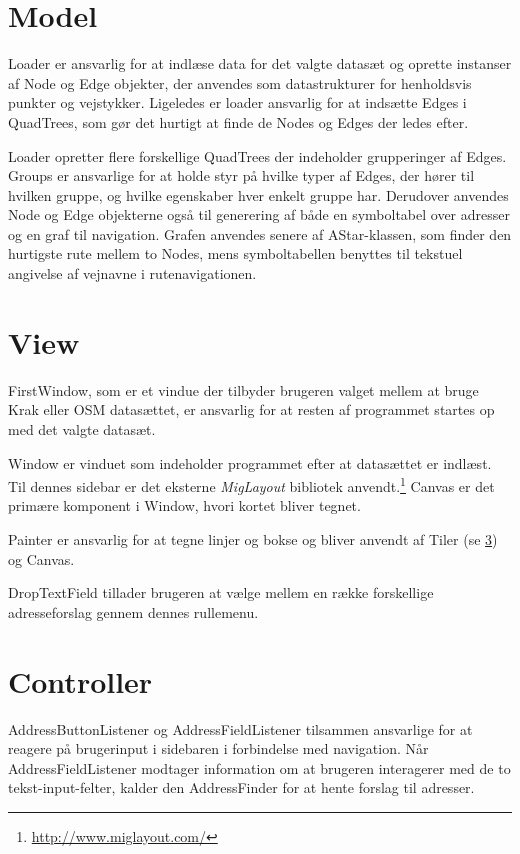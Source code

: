 \section{Model}
\label{sec:model}

Loader er ansvarlig for at indlæse data for det valgte datasæt og oprette instanser af Node og Edge objekter, der anvendes som datastrukturer for henholdsvis punkter og vejstykker. Ligeledes er loader ansvarlig for at indsætte Edges i QuadTrees, som gør det hurtigt at finde de Nodes og Edges der ledes efter.

Loader opretter flere forskellige QuadTrees der indeholder grupperinger af Edges. Groups er ansvarlige for at holde styr på hvilke typer af Edges, der hører til hvilken gruppe, og hvilke egenskaber hver enkelt gruppe har. Derudover anvendes Node og Edge objekterne også til generering af både en symboltabel over adresser og en graf til navigation. Grafen anvendes senere af AStar-klassen, som finder den hurtigste rute mellem to Nodes, mens symboltabellen benyttes til tekstuel angivelse af vejnavne i rutenavigationen.
	
\section{View}
\label{sec:view}

FirstWindow, som er et vindue der tilbyder brugeren valget mellem at bruge Krak eller OSM datasættet, er ansvarlig for at resten af programmet startes op med det valgte datasæt.

Window er vinduet som indeholder programmet efter at datasættet er indlæst. Til dennes sidebar er det eksterne \emph{MigLayout} bibliotek anvendt.\footnote{\url{http://www.miglayout.com/}} Canvas er det primære komponent i Window, hvori kortet bliver tegnet.

Painter er ansvarlig for at tegne linjer og bokse og bliver anvendt af Tiler (se \ref{sec:controller}) og Canvas.

DropTextField tillader brugeren at vælge mellem en række forskellige adresseforslag gennem dennes rullemenu.

\section{Controller}
\label{sec:controller}

AddressButtonListener og AddressFieldListener tilsammen ansvarlige for at reagere på brugerinput i sidebaren i forbindelse med navigation. Når AddressFieldListener modtager information om at brugeren interagerer med de to tekst-input-felter, kalder den AddressFinder for at hente forslag til adresser.

